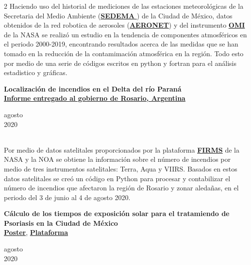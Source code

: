\documentclass[a3paper,15pt]{adcv}
\newcommand*{\aeronet}{\href{https://aeronet.gsfc.nasa.gov/}{\textbf{AERONET}}}
\newcommand*{\sedema}{\href{https://www.sedema.cdmx.gob.mx/}{\textbf{SEDEMA} }}
\newcommand*{\omi}{\href{https://aura.gsfc.nasa.gov/omi.html}{\textbf{OMI} }}
\begin{document}
\begin{multicols}{2}
    Haciendo uso del historial de mediciones de las estaciones meteorológicas de la Secretaria del Medio Ambiente (\sedema) de la Ciudad de México,
  datos obtenidos de la red robotica de aerosoles (\aeronet) y del instrumento \omi de la NASA se realizó un estudio en la tendencia de componentes atmosféricos
  en el periodo 2000-2019, encontrando resultados acerca de las medidas que se han tomado en la reducción de la contamimación atmosférica en la región.
  Todo esto por medio de una serie de códigos escritos en python y fortran para el análisis estadistico y gráficas.\\

  \begin{minipage}{0.8\linewidth}
    \textbf{Localización de incendios en el Delta del río Paraná}\\
    \href{https://github.com/giovannilopez9808/Posters_templates/blob/master/Informe\%20IFIR/Focos\%20de\%20incendio\%20en\%20las\%20islas\%20del\%20Paran\%C3\%A1\%20\%20frente\%20a\%20Rosario\%20\%20(Piacentini\%2C\%20Ipi\%C3\%B1a\%2C\%20Lopez-Padilla\%2C\%20Bolmaro)\%20(Piacentini).pdf}{\textbf{Informe entregado al gobierno de Rosario, Argentina}}
  \end{minipage}
    \begin{minipage}{0.2\linewidth}
      \vspace{-0.7cm}
      \begin{flushright}
      agosto \\2020
      \end{flushright}
    \end{minipage}\\
  
  Por medio de datos satelitales proporcionados por la plataforma \href{https://firms.modaps.eosdis.nasa.gov/}{\textbf{FIRMS}} de la NASA y la NOA
  se obtiene la información sobre el número de incendios por medio de tres instrumentos satelitales: Terra, Aqua y VIIRS. Basados en estos datos satelitales se creó un código
  en Python para procesar y contabilizar el número de incendios que afectaron la región de Rosario y zonar aledañas, en el periodo del 3 de junio al 4 de agosto 2020.\\

  \begin{minipage}{0.8\linewidth}
    \textbf{Cálculo de los tiempos de exposición solar para el tratamiendo de Psoriasis en la Ciudad de México}\\
    \href{https://github.com/giovannilopez9808/Posters_templates/blob/master/2020/CNF/TES/main.pdf}{\textbf{Poster}}, \href{http://tes-v1.herokuapp.com/}{\textbf{Plataforma}}
  \end{minipage}
    \begin{minipage}{0.2\linewidth}
      \vspace{-0.9cm}
      \begin{flushright}
      agosto \\2020
      \end{flushright}
    \end{minipage}\\


\end{multicols}
\end{document}
